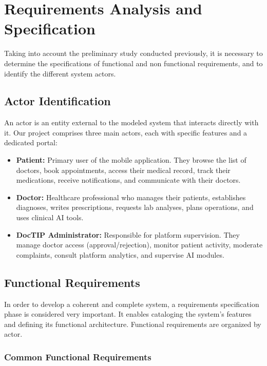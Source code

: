 \documentclass[12pt,a4paper,oneside]{report}
\begin{document}
\section{Requirements Analysis and Specification}

Taking into account the preliminary study conducted previously, it is necessary to determine the specifications of functional and non functional requirements, and to identify the different system actors.

\subsection{Actor Identification}

An actor is an entity external to the modeled system that interacts directly with it. Our project comprises three main actors, each with specific features and a dedicated portal:

\begin{itemize}
    \item \textbf{Patient:} Primary user of the mobile application. They browse the list of doctors, book appointments, access their medical record, track their medications, receive notifications, and communicate with their doctors.
    \item \textbf{Doctor:} Healthcare professional who manages their patients, establishes diagnoses, writes prescriptions, requests lab analyses, plans operations, and uses clinical AI tools.
    \item \textbf{DocTIP Administrator:} Responsible for platform supervision. They manage doctor access (approval/rejection), monitor patient activity, moderate complaints, consult platform analytics, and supervise AI modules.
\end{itemize}

\subsection{Functional Requirements}

In order to develop a coherent and complete system, a requirements specification phase is considered very important. It enables cataloging the system's features and defining its functional architecture. Functional requirements are organized by actor.

\subsubsection{Common Functional Requirements}
\end{document}
